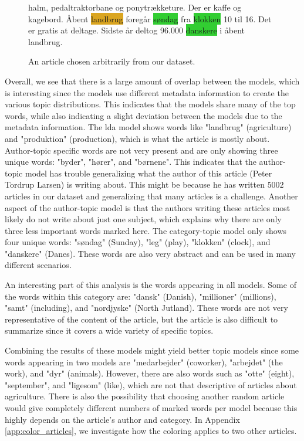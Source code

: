\begin{figure}[h]
\begin{tcolorbox}[boxsep=5pt, top=0pt, bottom=0pt, left=0pt, right=0pt]
{halm, pedaltraktorbane og ponytrækketure. Der er kaffe og kagebord. Åbent \colorbox{Goldenrod}{landbrug} foregår \colorbox{LimeGreen}{søndag} fra \colorbox{LimeGreen}{klokken} 10 til 16. Det er gratis at deltage. Sidste år deltog 96.000 \colorbox{LimeGreen}{danskere} i åbent landbrug.
		}
	\end{tcolorbox}
	\caption{An article chosen arbitrarily from our dataset.}
	\label{fig:the_article}
\end{figure}

Overall, we see that there is a large amount of overlap between the models, which is interesting since the models use different metadata information to create the various topic distributions.
This indicates that the models share many of the top words, while also indicating a slight deviation between the models due to the metadata information.
The \gls{lda} model shows words like "landbrug" (agriculture) and "produktion" (production), which is what the article is mostly about.
Author-topic specific words are not very present and are only showing three unique words: "byder", "hører", and "børnene".
This indicates that the author-topic model has trouble generalizing what the author of this article (Peter Tordrup Larsen) is writing about. 
This might be because he has written $5002$ articles in our dataset and generalizing that many articles is a challenge.
Another aspect of the author-topic model is that the authors writing these articles most likely do not write about just one subject, which explains why there are only three less important words marked here. 
The category-topic model only shows four unique words: "søndag" (Sunday), "leg" (play), "klokken" (clock), and "danskere" (Danes).
These words are also very abstract and can be used in many different scenarios.

An interesting part of this analysis is the words appearing in all models.
Some of the words within this category are: "dansk" (Danish), "millioner" (millions), "samt" (including), and "nordjyske" (North Jutland).
These words are not very representative of the content of the article, but the article is also difficult to summarize since it covers a wide variety of specific topics.

Combining the results of these models might yield better topic models since some words appearing in two models are "medarbejder" (coworker), "arbejdet" (the work), and "dyr" (animals).
However, there are also words such as "otte" (eight), "september", and "ligesom" (like), which are not that descriptive of articles about agriculture. 
There is also the possibility that choosing another random article would give completely different numbers of marked words per model because this highly depends on the article's author and category.
In Appendix \autoref{app:color_articles}, we investigate how the coloring applies to two other articles.




